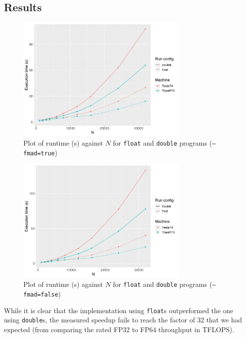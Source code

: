 \documentclass[12pt]{article}
\begin{document}
\subsection{Results}

\begin{figure}[H]
    \centering
    \includegraphics[width=0.75\textwidth]{double-float-comparison-fmad}
    \caption{Plot of runtime (s) against $N$ for \texttt{float} and \texttt{double} programs (\texttt{--fmad=true})}
    \label{fig:double-float-comparison-fmad}
\end{figure}

\begin{figure}[H]
    \centering
    \includegraphics[width=0.75\textwidth]{double-float-comparison-nofmad}
    \caption{Plot of runtime (s) against $N$ for \texttt{float} and \texttt{double} programs (\texttt{--fmad=false})}
    \label{fig:double-float-comparison-nofmad}
\end{figure}

While it is clear that the implementation using \texttt{float}s outperformed the one using \texttt{double}s, the measured speedup fails to reach the factor of 32 that we had expected (from comparing the rated FP32 to FP64 throughput in TFLOPS).\\
\end{document}
